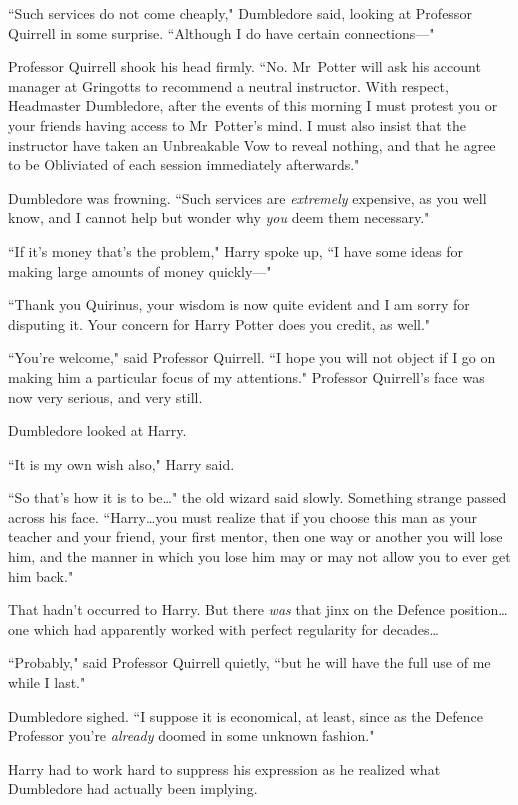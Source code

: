 ``Such services do not come cheaply," Dumbledore said, looking at Professor Quirrell in some surprise. ``Although I do have certain connections—"

Professor Quirrell shook his head firmly. ``No. Mr~Potter will ask his account manager at Gringotts to recommend a neutral instructor. With respect, Headmaster Dumbledore, after the events of this morning I must protest you or your friends having access to Mr~Potter's mind. I must also insist that the instructor have taken an Unbreakable Vow to reveal nothing, and that he agree to be Obliviated of each session immediately afterwards."

Dumbledore was frowning. ``Such services are \emph{extremely} expensive, as you well know, and I cannot help but wonder why \emph{you} deem them necessary."

``If it's money that's the problem," Harry spoke up, ``I have some ideas for making large amounts of money quickly—"

``Thank you Quirinus, your wisdom is now quite evident and I am sorry for disputing it. Your concern for Harry Potter does you credit, as well."

``You're welcome," said Professor Quirrell. ``I hope you will not object if I go on making him a particular focus of my attentions." Professor Quirrell's face was now very serious, and very still.

Dumbledore looked at Harry.

``It is my own wish also," Harry said.

``So that's how it is to be…" the old wizard said slowly. Something strange passed across his face. ``Harry…you must realize that if you choose this man as your teacher and your friend, your first mentor, then one way or another you will lose him, and the manner in which you lose him may or may not allow you to ever get him back."

That hadn't occurred to Harry. But there \emph{was} that jinx on the Defence position…one which had apparently worked with perfect regularity for decades…

``Probably," said Professor Quirrell quietly, ``but he will have the full use of me while I last."

Dumbledore sighed. ``I suppose it is economical, at least, since as the Defence Professor you're \emph{already} doomed in some unknown fashion."

Harry had to work hard to suppress his expression as he realized what Dumbledore had actually been implying.

